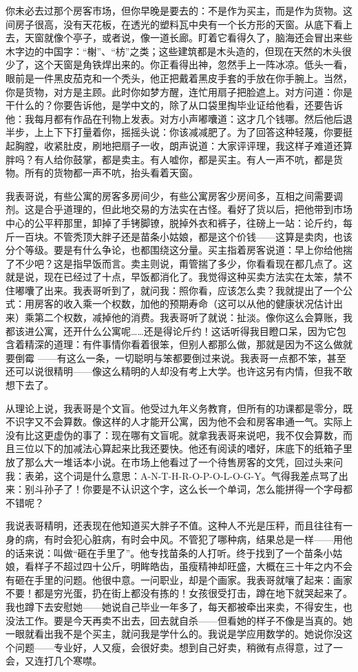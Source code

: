 你未必去过那个房客市场，但你早晚是要去的：不是作为买主，而是作为货物。这间房子很高，没有天花板，在透光的塑料瓦中央有一个长方形的天窗。从底下看上去，天窗就像个亭子，或者说，像一道长廊。盯着它看得久了，脑海还会冒出来些木字边的中国字：“榭”、“枋”之类；这些建筑都是木头造的，但现在天然的木头很少了，这个天窗是角铁焊出来的。你正看得出神，忽然手上一阵冰凉。低头一看，眼前是一件黑皮茄克和一个秃头，他正把戴着黑皮手套的手放在你手腕上。当然，你是货物，对方是主顾。此时你如梦方醒，连忙用扇子把脸遮上。对方问道：你是干什么的？你要告诉他，是学中文的，除了从口袋里掏毕业证给他看，还要告诉他：我每月都有作品在刊物上发表。对方小声嘟囔道：这才几个钱哪。然后他后退半步，上上下下打量着你，摇摇头说：你该减减肥了。为了回答这种轻蔑，你要挺起胸膛，收紧肚皮，刷地把扇子一收，朗声说道：大家评评理，我这样子难道还算胖吗？有人给你鼓掌，都是卖主。有人嘘你，都是买主。有人一声不吭，都是货物。所有的货物都一声不吭，抬头看着天窗。 

我表哥说，有些公寓的房客多房间少，有些公寓房客少房间多，互相之间需要调剂。这是合乎道理的，但此地交易的方法实在古怪。看好了货以后，把他带到市场中心的公平秤那里，卸掉了手铐脚镣，脱掉外衣和裤子，往磅上一站：论斤约，每斤一百块。不管秃顶大胖子还是苗条小姑娘，都是这个价钱——这算是卖肉，也该分个等级。要是有什么争论，也都围绕这分量。买主指着房客说道：早上你给他揣了不少吧？这是指早饭而言。卖主则说，甭管揣了多少，你看看现在都几点了。这就是说，现在已经过了十点，早饭都消化了。我觉得这种买卖方法实在太笨，禁不住嘟囔了出来。我表哥听到了，就问我：照你看，应该怎么卖？我就提出了一个公式：用房客的收入乘一个权数，加他的预期寿命（这可以从他的健康状况估计出来）乘第二个权数，减掉他的消费。我表哥听了就说：扯淡。像你这么会算账，我都该进公寓，还开什么公寓呢……还是得论斤约！这话听得我目瞪口呆，因为它包含着精深的道理：有件事情你看着很笨，但别人都那么做，那就是因为不这么做就要倒霉 ——有这么一条，一切聪明与笨都要倒过来说。我表哥一点都不笨，甚至还可以说很精明——像这么精明的人却没有考上大学。也许这另有内情，但我不敢想下去了。 

从理论上说，我表哥是个文盲。他受过九年义务教育，但所有的功课都是零分，既不识字又不会算数。像这样的人才能开公寓，因为他不会和房客串通一气。实际上没有比这更虚伪的事了：现在哪有文盲呢。就拿我表哥来说吧，我不仅会算数，而且三位以下的加减法心算起来比我还要快。他还有阅读的嗜好，床底下的纸箱子里放了那么大一堆话本小说。在市场上他看过了一个待售房客的文凭，回过头来问我：表弟，这个词是什么意思：A-N-T-H-R-O-P-O-L-O-G-Y。气得我差点骂了出来：别斗孙子了！你要是不认识这个字，这么长一个单词，怎么能拼得一个字母都不错呢？ 

我说表哥精明，还表现在他知道买大胖子不值。这种人不光是压秤，而且往往有一身的病，有时会犯心脏病，有时会中风。不管犯了哪种病，结果总是一样——用他的话来说：叫做“砸在手里了”。他专找苗条的人打听。终于找到了一个苗条小姑娘，看样子不超过四十公斤，明眸皓齿，虽瘦精神却旺盛，大概在三十年之内不会有砸在手里的问题。他很中意。一问职业，却是个画家。我表哥就嚷了起来：画家不要！都是穷光蛋，扔在街上都没有拣的！女孩很受打击，蹲在地下就哭起来了。我也蹲下去安慰她——她说自己毕业一年多了，每天都被牵出来卖，不得安生，也没法工作。要是今天再卖不出去，回去就自杀——但看她的样子不像是当真的。她一眼就看出我不是个买主，就问我是学什么的。我说是学应用数学的。她说你没这个问题——专业好，人又瘦，会很好卖。想到自己好卖，稍微有点得意，过了一会，又连打几个寒噤。 



